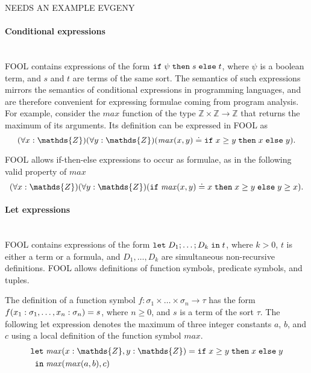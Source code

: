 \documentclass{easychair}
\begin{document}
NEEDS AN EXAMPLE EVGENY

\paragraph{Conditional expressions}~\\
FOOL contains expressions of the form $\mathtt{if}\;{\psi}\;\allowbreak\mathtt{then}\;{s}\;\allowbreak\mathtt{else}\;{t}$, where $\psi$ is a
boolean term, and $s$ and $t$ are terms of the same sort. 
The semantics of such expressions mirrors the semantics of conditional 
expressions in programming languages, and are therefore convenient for 
expressing formulae coming from program analysis. 
For example, consider the $\mathit{max}$ function of the type 
$\mathds{Z}\times\mathds{Z}\to\mathds{Z}$ that returns the maximum of its 
arguments. 
Its definition can be expressed in FOOL as
\begin{equation}\label{eq:ite-t-example}
(\forall x:\mathds{Z})(\forall y:\mathds{Z})
(\mathit{max}(x, y) \eql \ite{x \geq y}{x}{y}).
\end{equation}

FOOL allows if-then-else expressions to occur as formulae, as in the
following valid property of $\mathit{max}$
\begin{equation}\label{eq:ite-f-example}
(\forall x:\mathds{Z})(\forall y:\mathds{Z})
(\ite{\mathit{max}(x, y) \eql x}{x \geq y}{y \geq x}).
\end{equation}

\paragraph{Let expressions}~\\
FOOL contains expressions of the form $\mathtt{let}\;{D_1;\ldots;D_k}\;\allowbreak\mathtt{in}\;{t}$, where
$k > 0$, $t$ is either a term or a formula, and $D_1,\ldots,D_k$ are
simultaneous non-recursive definitions. FOOL allows definitions of function
symbols, predicate symbols, and tuples.

The definition of a function symbol 
$f:\sigma_1\times\ldots\times\sigma_n\to\tau$ has the form 
${f(x_1:\sigma_1,\ldots,x_n:\sigma_n)}={s}$, where
$n \geq 0$, and $s$ is a term of the sort $\tau$.
The following let expression denotes the maximum of three integer constants
$a$, $b$, and $c$ using a local definition of the function symbol
$\mathit{max}$.
\begin{equation}\label{eq:fool-let-impl}
\begin{aligned}
\mathtt{let}\;&\binding{\mathit{max}(x:\mathds{Z},y:\mathds{Z})}
                       {\ite{x \geq y}{x}{y}}\\
 \mathtt{in}\;&\mathit{max}(\mathit{max}(a,b),c)
\end{aligned}
\end{equation}
\end{document}
